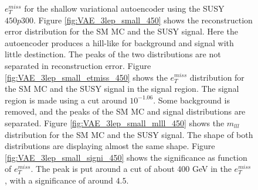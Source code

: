 \begin{figure}[H]
{    $e_T^{miss}$ for the shallow variational autoencoder using the SUSY $450p300$. 
    Figure \ref{fig:VAE_3lep_small_450} shows the reconstruction error 
    distribution for the SM MC and the SUSY signal. Here the autoencoder produces a hill-like for background and 
    signal with little destinction. The peaks of the two distributions are not separated in reconstruction error. Figure \ref{fig:VAE_3lep_small_etmiss_450} 
    shows the $e_T^{miss}$ distribution for the SM MC and the SUSY signal in the signal region. 
    The signal region is made using a cut around $10^{-1.06}$. Some background is removed, and the peaks of the SM MC and signal 
    distributions are separated. Figure \ref{fig:VAE_3lep_small_mlll_450} shows the $m_{lll}$ distribution for the SM MC and the SUSY signal. 
    The shape of both distributions are displaying almost the same shape. Figure \ref{fig:VAE_3lep_small_signi_450} shows the significance as 
    function of $e_T^{miss}$. The peak is put around a cut of about 400 GeV in the $e_T^{miss}$, with a significance of around $4.5$.}
    \label{fig:VAE_3lep_small_rec_sig_signi_450}
\end{figure}








